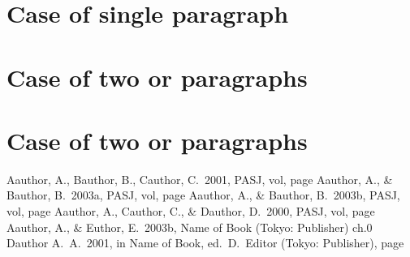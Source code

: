 \documentclass[]{pasj01}
\begin{document}
\appendix 
\section*{Case of single paragraph}

\section{Case of two or paragraphs}

\section{Case of two or paragraphs}


\begin{thebibliography}{}
  Aauthor, A., Bauthor, B., Cauthor, C.\ 2001, PASJ, vol, page
  Aauthor, A., \& Bauthor, B.\ 2003a, PASJ, vol, page   
  Aauthor, A., \& Bauthor, B.\ 2003b, PASJ, vol, page  
  Aauthor, A., Cauthor, C., \& Dauthor, D.\ 2000, PASJ, vol, page   
  Aauthor, A., \& Euthor, E.\ 2003b, Name of Book (Tokyo: Publisher) ch.0    
  Dauthor A.~A.\ 2001, in Name of Book,
   ed.\  D.~Editor (Tokyo: Publisher), page
\end{thebibliography}
\end{document}
